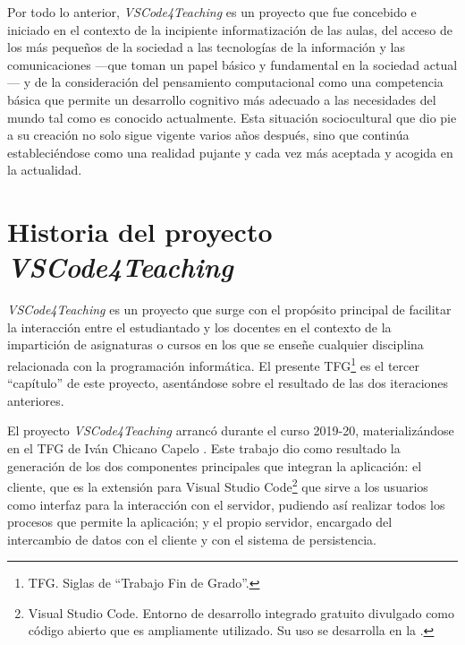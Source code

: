 Por todo lo anterior, \textit{VSCode4Teaching} es un proyecto que fue concebido e iniciado en el contexto de la incipiente informatización de las aulas, del acceso de los más pequeños de la sociedad a las tecnologías de la información y las comunicaciones ---que toman un papel básico y fundamental en la sociedad actual--- y de la consideración del pensamiento computacional como una competencia básica que permite un desarrollo cognitivo más adecuado a las necesidades del mundo tal como es conocido actualmente. Esta situación sociocultural que dio pie a su creación no solo sigue vigente varios años después, sino que continúa estableciéndose como una realidad pujante y cada vez más aceptada y acogida en la actualidad.

\section{Historia del proyecto \textit{VSCode4Teaching}}
\label{sec:historiaProyecto}
\textit{VSCode4Teaching} es un proyecto que surge con el propósito principal de facilitar la interacción entre el estudiantado y los docentes en el contexto de la impartición de asignaturas o cursos en los que se enseñe cualquier disciplina relacionada con la programación informática. El presente TFG\footnote{TFG. Siglas de ``Trabajo Fin de Grado''.} es el tercer ``capítulo'' de este proyecto, asentándose sobre el resultado de las dos iteraciones anteriores.

El proyecto \textit{VSCode4Teaching} arrancó durante el curso 2019-20, materializándose en el TFG de Iván Chicano Capelo \cite{TFG_Ivan}. Este trabajo dio como resultado la generación de los dos componentes principales que integran la aplicación: el cliente, que es la extensión para Visual Studio Code\footnote{Visual Studio Code. Entorno de desarrollo integrado gratuito divulgado como código abierto que es ampliamente utilizado. Su uso se desarrolla en la .} que sirve a los usuarios como interfaz para la interacción con el servidor, pudiendo así realizar todos los procesos que permite la aplicación; y el propio servidor, encargado del intercambio de datos con el cliente y con el sistema de persistencia.

